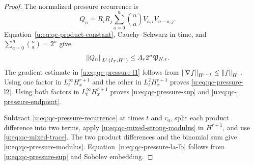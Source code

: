 \begin{proof}
The normalized pressure recurrence is
\begin{equation}
 Q_n=R_iR_j\sum_{a=0}^{n}\binom na V_{a,i}V_{n-a,j}.
 \label{u:eq:qc-pressure-recurrence}
\end{equation}
Equation~\eqref{u:eq:qc-product-constant}, Cauchy--Schwarz in time, and
\(\sum_{a=0}^n\binom na=2^n\) give
\begin{equation}
 \left\lVert Q_n\right\rVert_{L^1(I_T;H^r)}
 \le A_r2^n\mathfrak P_{N,r}.
 \label{u:eq:qc-pressure-L1-sharp}
\end{equation}
The gradient estimate in \eqref{u:eq:qc-pressure-l1} follows from
\(\left\lVert \nabla f\right\rVert_{H^{r-1}}\le\left\lVert f\right\rVert_{H^r}\).
Using one factor in \(L_t^\infty H_x^{r+1}\) and the other in
\(L_t^2H_x^{r+1}\) proves \eqref{u:eq:qc-pressure-l2}.  Using both factors in
\(L_t^\infty H_x^{r+1}\) proves \eqref{u:eq:qc-pressure-sup} and
\eqref{u:eq:qc-pressure-endpoint}.

Subtract \eqref{u:eq:qc-pressure-recurrence} at times \(t\) and \(r_0\), split
each product difference into two terms, apply
\eqref{u:eq:qc-mixed-strong-modulus} in \(H^{r+1}\), and use
\eqref{u:eq:qc-mixed-trace}.  The two product differences and the binomial sum
give \eqref{u:eq:qc-pressure-modulus}.  Equation~\eqref{u:eq:qc-pressure-la-lb}
follows from \eqref{u:eq:qc-pressure-sup} and Sobolev embedding.
\end{proof}

